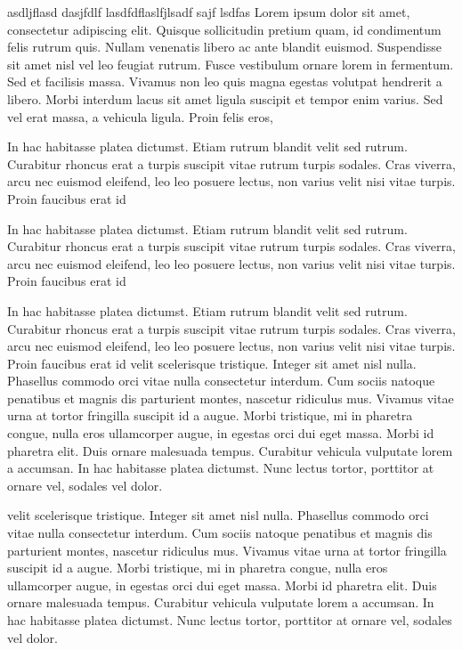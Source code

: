 
 

asdljflasd dasjfdlf lasdfdflaslfjlsadf sajf lsdfas Lorem ipsum dolor
sit amet, consectetur adipiscing elit. Quisque sollicitudin pretium
quam, id condimentum felis rutrum quis. Nullam venenatis libero ac
ante blandit euismod. Suspendisse sit amet nisl vel leo feugiat
rutrum. Fusce vestibulum ornare lorem in fermentum. Sed et facilisis
massa. Vivamus non leo quis magna egestas volutpat hendrerit a
libero. Morbi interdum lacus sit amet ligula suscipit et tempor enim
varius. Sed vel erat massa, a vehicula ligula. Proin felis eros,

\noindent In hac habitasse platea dictumst. Etiam rutrum blandit velit sed
rutrum. Curabitur rhoncus erat a turpis suscipit vitae rutrum turpis
sodales. Cras viverra, arcu nec euismod eleifend, leo leo posuere
lectus, non varius velit nisi vitae turpis. Proin faucibus erat id

In hac habitasse platea dictumst. Etiam rutrum blandit velit sed
rutrum. Curabitur rhoncus erat a turpis suscipit vitae rutrum turpis
sodales. Cras viverra, arcu nec euismod eleifend, leo leo posuere
lectus, non varius velit nisi vitae turpis. Proin faucibus erat id

In hac habitasse platea dictumst. Etiam rutrum blandit velit sed
rutrum. Curabitur rhoncus erat a turpis suscipit vitae rutrum turpis
sodales. Cras viverra, arcu nec euismod eleifend, leo leo posuere
lectus, non varius velit nisi vitae turpis. Proin faucibus erat id
velit scelerisque tristique. Integer sit amet nisl nulla. Phasellus
commodo orci vitae nulla consectetur interdum. Cum sociis natoque
penatibus et magnis dis parturient montes, nascetur ridiculus
mus. Vivamus vitae urna at tortor fringilla suscipit id a augue. Morbi
tristique, mi in pharetra congue, nulla eros ullamcorper augue, in
egestas orci dui eget massa. Morbi id pharetra elit. Duis ornare
malesuada tempus. Curabitur vehicula vulputate lorem a accumsan. In
hac habitasse platea dictumst. Nunc lectus tortor, porttitor at ornare
vel, sodales vel dolor.

velit scelerisque tristique. Integer sit amet nisl nulla. Phasellus
commodo orci vitae nulla consectetur interdum. Cum sociis natoque
penatibus et magnis dis parturient montes, nascetur ridiculus
mus. Vivamus vitae urna at tortor fringilla suscipit id a augue. Morbi
tristique, mi in pharetra congue, nulla eros ullamcorper augue, in
egestas orci dui eget massa. Morbi id pharetra elit. Duis ornare
malesuada tempus. Curabitur vehicula vulputate lorem a accumsan. In
hac habitasse platea dictumst. Nunc lectus tortor, porttitor at ornare
vel, sodales vel dolor.


